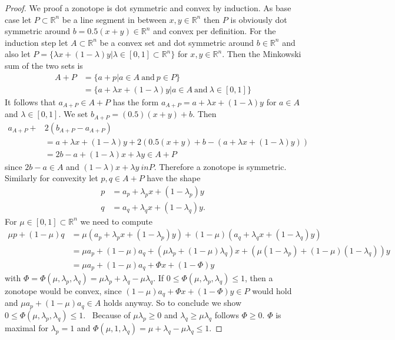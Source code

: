 \documentclass{article}
\theoremstyle{definition}
\begin{document}
\begin{proof}
We proof a zonotope is dot symmetric and convex by induction. As base case let $P \subset \mathbb{R}^{n}$ be a line segment in between $x, y \in \mathbb{R}^{n}$ then $P$ is obviously dot symmetric around $b=0.5(x+y) \in \mathbb{R}^{n}$ and convex per definition. For the induction step let $A \subset \mathbb{R}^{n}$ be a convex set and dot symmetric around $b \in \mathbb{R}^{n}$ and also let $P = \{ \lambda x + (1- \lambda) y | \lambda \in [0,1] \subset \mathbb{R}^{n} \}$ for $x, y \in \mathbb{R}^{n}$. Then the Minkowski sum of the two sets is
\begin{align*}
A + P 
&= \{ a + p | a \in A \ \text{and} \ p \in P \} \\
&= \{ a + \lambda x + (1- \lambda) y | a \in A \ \text{and} \ \lambda \in [0,1] \}
\end{align*}
It follows that $a_{A+P} \in A+P$ has the form $a_{A+P}=a + \lambda x + (1- \lambda)y$ for $a\in A$ and $\lambda \in [0,1]$. We set $b_{A+P}=(0.5)(x+y) + b$. Then
\begin{align*}
a_{A+P} + &2(b_{A+P} - a_{A+P}) \\
&= a + \lambda x + (1- \lambda)y + 2( 0.5(x+y) + b - (a + \lambda x + (1-\lambda)y)) \\
&= 2b-a + (1- \lambda) x + \lambda y \in A+P
\end{align*}
since $2b-a \in A$ and $(1- \lambda) x + \lambda y \ in P$. Therefore a zonotope is symmetric.
Similarly for convexity let $p, q \in A+P$ have the shape
\begin{align*}
p &= a_{p} + \lambda_{p} x + (1 - \lambda_{p}) y \\
q &= a_{q} + \lambda_{q} x + (1 - \lambda_{q}) y.
\end{align*}
For $\mu \in [0, 1] \subset \mathbb{R}^{n}$ we need to compute
\begin{align*}
\mu p + (1 - \mu) q &= \mu (a_{p} + \lambda_{p} x + (1-\lambda_{p}) y) + (1-\mu)(a_{q} + \lambda_{q} x + (1-\lambda_{q}) y) \\
&= \mu a_{p} + (1-\mu) a_{q} + (\mu \lambda_{p} + (1-\mu)\lambda_{q})x + (\mu(1-\lambda_{p}) + (1-\mu)(1-\lambda_{q}))y \\
&= \mu a_{p} + (1-\mu) a_{q} + \Phi x + (1- \Phi) y
\end{align*}
with $\Phi = \Phi(\mu , \lambda_{p}, \lambda_{q}) = \mu \lambda_{p} + \lambda_{q} - \mu \lambda_{q}$. If $0 \leq \Phi (\mu, \lambda_{p}, \lambda_{q}) \leq 1$, then a zonotope would be convex, since $(1-\mu) a_{q} + \Phi x + (1- \Phi) y \in P$ would hold and $\mu a_{p} + (1-\mu) a_{q} \in A$ holds anyway. So to conclude we show $0 \leq \Phi (\mu, \lambda_{p}, \lambda_{q}) \leq 1$. \
Because of $\mu \lambda_{p} \geq 0$ and $\lambda_{q} \geq \mu \lambda_{q}$ follows $\Phi \geq 0$. $\Phi$ is maximal for $\lambda_{p} = 1$ and $\Phi (\mu, 1, \lambda_{q}) = \mu + \lambda_{q} - \mu \lambda_{q} \leq 1$.
\end{proof}
\end{document}
